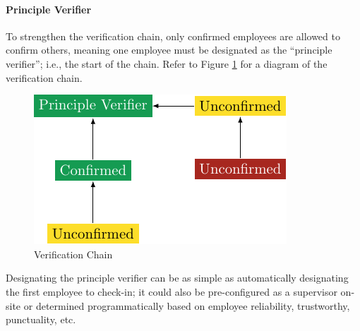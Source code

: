 \paragraph{Principle Verifier}

To strengthen the verification chain, only confirmed
employees are allowed to confirm others, meaning one
employee must be designated as the \enquote{principle
  verifier}; i.e., the start of the chain.
Refer to Figure \ref{fig:verificationTree} for a diagram of
the verification chain.

\begin{figure}[h]
  \centering
  \includegraphics{05 design/assets/verification tree.pdf}
  \caption{Verification Chain}
  \label{fig:verificationTree}
\end{figure}

Designating the principle verifier can be as simple as
automatically designating the first employee to check-in;
it could also be pre-configured as a supervisor on-site or
determined programmatically based on employee reliability,
trustworthy, punctuality, etc.